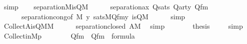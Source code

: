 \begin{isabellebody}
\ simp\isanewline
\ \ \isamarkupfalse%
\ {\isachardoublequoteopen}separation{\isacharparenleft}{\kern0pt}{\isacharhash}{\kern0pt}{\isacharhash}{\kern0pt}M{\isacharcomma}{\kern0pt}is{\isacharunderscore}{\kern0pt}Q{\isacharparenleft}{\kern0pt}{\isacharhash}{\kern0pt}{\isacharhash}{\kern0pt}M{\isacharparenright}{\kern0pt}{\isacharparenright}{\kern0pt}{\isachardoublequoteclose}\isanewline
\ \ \ \ \isamarkupfalse%
\ separation{\isacharunderscore}{\kern0pt}ax\ Qsats\ Qarty\ Qfm\isanewline
\ \ \ \ \ \ separation{\isacharunderscore}{\kern0pt}cong{\isacharbrackleft}{\kern0pt}of\ {\isachardoublequoteopen}{\isacharhash}{\kern0pt}{\isacharhash}{\kern0pt}M{\isachardoublequoteclose}\ {\isachardoublequoteopen}{\isasymlambda}y{\isachardot}{\kern0pt}\ sats{\isacharparenleft}{\kern0pt}M{\isacharcomma}{\kern0pt}Q{\isacharunderscore}{\kern0pt}fm{\isacharcomma}{\kern0pt}{\isacharbrackleft}{\kern0pt}y{\isacharbrackright}{\kern0pt}{\isacharparenright}{\kern0pt}{\isachardoublequoteclose}\ {\isachardoublequoteopen}is{\isacharunderscore}{\kern0pt}Q{\isacharparenleft}{\kern0pt}{\isacharhash}{\kern0pt}{\isacharhash}{\kern0pt}M{\isacharparenright}{\kern0pt}{\isachardoublequoteclose}{\isacharbrackright}{\kern0pt}\isanewline
\ \ \ \ \isamarkupfalse%
\ simp\isanewline
\ \ \isamarkupfalse%
\ \isanewline
\ \ \isamarkupfalse%
\ {\isachardoublequoteopen}Collect{\isacharparenleft}{\kern0pt}A{\isacharcomma}{\kern0pt}is{\isacharunderscore}{\kern0pt}Q{\isacharparenleft}{\kern0pt}{\isacharhash}{\kern0pt}{\isacharhash}{\kern0pt}M{\isacharparenright}{\kern0pt}{\isacharparenright}{\kern0pt}{\isasymin}M{\isachardoublequoteclose}\isanewline
\ \ \ \ \isamarkupfalse%
\ separation{\isacharunderscore}{\kern0pt}closed\ {\isacartoucheopen}A{\isasymin}M{\isacartoucheclose}\ \isamarkupfalse%
\ simp\ \isanewline
\ \ \isamarkupfalse%
\isanewline
\ \ \isamarkupfalse%
\ {\isacharquery}{\kern0pt}thesis\ \isamarkupfalse%
\ {}\ \isamarkupfalse%
\ simp\isanewline
{}\isamarkupfalse%
%
\endisatagproof
{\isafoldproof}%
%
\isadelimproof
\isanewline
%
\endisadelimproof
\isanewline
{}\isamarkupfalse%
\ Collect{\isacharunderscore}{\kern0pt}in{\isacharunderscore}{\kern0pt}M{\isacharunderscore}{\kern0pt}{}p\ {\isacharcolon}{\kern0pt}\isanewline
\ \ \isanewline
\ \ \ \ Qfm\ {\isacharcolon}{\kern0pt}\ {\isachardoublequoteopen}Q{\isacharunderscore}{\kern0pt}fm\ {\isasymin}\ formula{\isachardoublequoteclose}\ \isanewline

\end{isabellebody}

